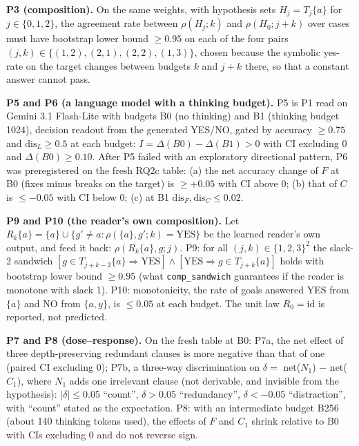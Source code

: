 \textbf{P3 (composition).} On the same weights, with hypothesis sets \(H_j=T_j\{a\}\) for \(j\in\{0,1,2\}\), the agreement rate between \(\rho(H_j;k)\) and \(\rho(H_0;j{+}k)\) over cases must have bootstrap lower bound \(\ge0.95\) on each of the four pairs \((j,k)\in\{(1,2),(2,1),(2,2),(1,3)\}\), chosen because the symbolic yes-rate on the target changes between budgets \(k\) and \(j+k\) there, so that a constant answer cannot pass.

\textbf{P5 and P6 (a language model with a thinking budget).} P5 is P1 read on Gemini 3.1 Flash-Lite with budgets B0 (no thinking) and B1 (thinking budget 1024), decision readout from the generated YES/NO, gated by accuracy \(\ge0.75\) and \(\mathrm{dis}_L\ge0.5\) at each budget: \(I=\Delta(B0)-\Delta(B1)>0\) with CI excluding 0 and \(\Delta(B0)\ge0.10\). After P5 failed with an exploratory directional pattern, P6 was preregistered on the fresh RQ2c table: (a) the net accuracy change of \(F\) at B0 (fixes minus breaks on the target) is \(\ge+0.05\) with CI above 0; (b) that of \(C\) is \(\le-0.05\) with CI below 0; (c) at B1 \(\mathrm{dis}_F,\mathrm{dis}_C\le0.02\).

\textbf{P9 and P10 (the reader's own composition).} Let \(R_k\{a\}=\{a\}\cup\{g'\neq a:\rho(\{a\},g';k)=\text{YES}\}\) be the learned reader's own output, and feed it back: \(\rho(R_k\{a\},g;j)\). P9: for all \((j,k)\in\{1,2,3\}^2\) the slack-2 sandwich \([g\in T_{j+k-2}\{a\}\Rightarrow\text{YES}]\wedge[\text{YES}\Rightarrow g\in T_{j+k}\{a\}]\) holds with bootstrap lower bound \(\ge0.95\) (what \texttt{comp\_sandwich} guarantees if the reader is monotone with slack 1). P10: monotonicity, the rate of goals answered YES from \(\{a\}\) and NO from \(\{a,y\}\), is \(\le0.05\) at each budget. The unit law \(R_0=\mathrm{id}\) is reported, not predicted.

\textbf{P7 and P8 (dose--response).} On the fresh table at B0: P7a, the net effect of three depth-preserving redundant clauses is more negative than that of one (paired CI excluding 0); P7b, a three-way discrimination on \(\delta=\) net(\(N_1\)) \(-\) net(\(C_1\)), where \(N_1\) adds one irrelevant clause (not derivable, and invisible from the hypothesis): \(|\delta|\le0.05\) ``count'', \(\delta>0.05\) ``redundancy'', \(\delta<-0.05\) ``distraction'', with ``count'' stated as the expectation. P8: with an intermediate budget B256 (about 140 thinking tokens used), the effects of \(F\) and \(C_1\) shrink relative to B0 with CIs excluding 0 and do not reverse sign.

